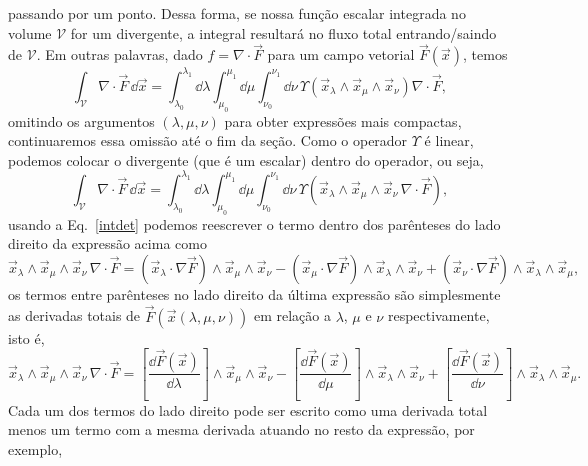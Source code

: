 passando por um ponto. Dessa forma, se nossa função escalar integrada no volume
$\mathcal{V}$ for um divergente, a integral resultará no fluxo total
entrando/saindo de $\mathcal{V}$. Em outras palavras, dado $f =
	\nabla\cdot\vec{F}$ para um campo vetorial $\vec{F}(\vec{x})$, temos
\begin{equation*}
	\int_{\mathcal{V}}\nabla\cdot\vec{F}\, \dd \vec{x} = \int_{\lambda_0}^{\lambda_1}\dd \lambda\int_{\mu_0}^{\mu_1}\dd \mu\int_{\nu_0}^{\nu_1}\dd \nu\, \Upsilon\left(\vec{x}_\lambda\wedge\vec{x}_\mu\wedge\vec{x}_\nu\right)\nabla\cdot\vec{F},
\end{equation*}
omitindo os argumentos $(\lambda,\mu,\nu)$ para obter expressões mais compactas,
continuaremos essa omissão até o fim da seção. Como o operador $\Upsilon$ é
linear, podemos colocar o divergente (que é um escalar) dentro do operador, ou
seja,
\begin{equation}
	\int_{\mathcal{V}}\nabla\cdot\vec{F}\, \dd \vec{x} = \int_{\lambda_0}^{\lambda_1}\dd \lambda\int_{\mu_0}^{\mu_1}\dd \mu\int_{\nu_0}^{\nu_1}\dd \nu\, \Upsilon\left(\vec{x}_\lambda\wedge\vec{x}_\mu\wedge\vec{x}_\nu\,\nabla\cdot\vec{F}\right),
\end{equation}
usando a Eq.~\eqref{intdet} podemos reescrever o termo dentro dos parênteses do
lado direito da expressão acima como
\begin{equation}\label{prepp}
	\vec{x}_\lambda\wedge\vec{x}_\mu\wedge\vec{x}_\nu\,\nabla\cdot\vec{F} =\left(\vec{x}_\lambda\cdot\nabla\vec{F}\right)\wedge\vec{x}_\mu\wedge\vec{x}_\nu-\left(\vec{x}_\mu\cdot\nabla\vec{F}\right)\wedge\vec{x}_\lambda\wedge\vec{x}_\nu+\left(\vec{x}_\nu\cdot\nabla\vec{F}\right)\wedge\vec{x}_\lambda\wedge\vec{x}_\mu,
\end{equation}
os termos entre parênteses no lado direito da última expressão são simplesmente
as derivadas totais de $\vec{F}\left(\vec{x}(\lambda,\mu,\nu)\right)$ em relação
a $\lambda$, $\mu$ e $\nu$ respectivamente, isto é,
\begin{equation}\label{semi1}
	\vec{x}_\lambda\wedge\vec{x}_\mu\wedge\vec{x}_\nu\,\nabla\cdot\vec{F} = \left[\frac{\dd \vec{F}\left(\vec{x}\right)}{\dd \lambda}\right]\wedge\vec{x}_\mu\wedge\vec{x}_\nu-\left[\frac{\dd \vec{F}\left(\vec{x}\right)}{\dd \mu}\right]\wedge\vec{x}_\lambda\wedge\vec{x}_\nu +\left[\frac{\dd \vec{F}\left(\vec{x}\right)}{\dd \nu}\right]\wedge\vec{x}_\lambda\wedge\vec{x}_\mu.
\end{equation}
Cada um dos termos do lado direito pode ser escrito como uma derivada total
menos um termo com a mesma derivada atuando no resto da expressão, por exemplo,
